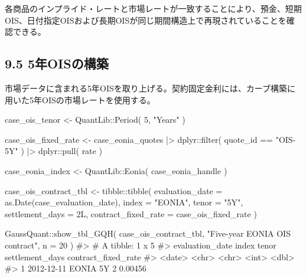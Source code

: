 \documentclass[
  letterpaper,
  DIV=11,
  numbers=noendperiod]{scrreprt}
\newenvironment{Shaded}{\begin{snugshade}}{\end{snugshade}}
\newcommand{\AttributeTok}[1]{\textcolor[rgb]{0.40,0.45,0.13}{#1}}
\newcommand{\CommentTok}[1]{\textcolor[rgb]{0.37,0.37,0.37}{#1}}
\newcommand{\DecValTok}[1]{\textcolor[rgb]{0.68,0.00,0.00}{#1}}
\newcommand{\FunctionTok}[1]{\textcolor[rgb]{0.28,0.35,0.67}{#1}}
\newcommand{\NormalTok}[1]{\textcolor[rgb]{0.00,0.23,0.31}{#1}}
\newcommand{\OtherTok}[1]{\textcolor[rgb]{0.00,0.23,0.31}{#1}}
\newcommand{\SpecialCharTok}[1]{\textcolor[rgb]{0.37,0.37,0.37}{#1}}
\newcommand{\StringTok}[1]{\textcolor[rgb]{0.13,0.47,0.30}{#1}}
\begin{document}
各商品のインプライド・レートと市場レートが一致することにより、預金、短期OIS、日付指定OISおよび長期OISが同じ期間構造上で再現されていることを確認できる。

\subsection{9.5 5年OISの構築}\label{ux5e74oisux306eux69cbux7bc9}

市場データに含まれる5年OISを取り上げる。契約固定金利には、カーブ構築に用いた5年OISの市場レートを使用する。

\begin{Shaded}
\begin{Highlighting}[]
\NormalTok{case\_ois\_tenor }\OtherTok{\textless{}{-}}\NormalTok{ QuantLib}\SpecialCharTok{::}\FunctionTok{Period}\NormalTok{(}
  \DecValTok{5}\NormalTok{,}
  \StringTok{"Years"}
\NormalTok{)}

\NormalTok{case\_ois\_fixed\_rate }\OtherTok{\textless{}{-}}\NormalTok{ case\_eonia\_quotes }\SpecialCharTok{|\textgreater{}}
\NormalTok{  dplyr}\SpecialCharTok{::}\FunctionTok{filter}\NormalTok{(}
\NormalTok{    quote\_id }\SpecialCharTok{==} \StringTok{"OIS{-}5Y"}
\NormalTok{  ) }\SpecialCharTok{|\textgreater{}}
\NormalTok{  dplyr}\SpecialCharTok{::}\FunctionTok{pull}\NormalTok{(}
\NormalTok{    rate}
\NormalTok{  )}

\NormalTok{case\_eonia\_index }\OtherTok{\textless{}{-}}\NormalTok{ QuantLib}\SpecialCharTok{::}\FunctionTok{Eonia}\NormalTok{(}
\NormalTok{  case\_eonia\_handle}
\NormalTok{)}

\NormalTok{case\_ois\_contract\_tbl }\OtherTok{\textless{}{-}}\NormalTok{ tibble}\SpecialCharTok{::}\FunctionTok{tibble}\NormalTok{(}
  \AttributeTok{evaluation\_date =} \FunctionTok{as.Date}\NormalTok{(case\_evaluation\_date),}
  \AttributeTok{index =} \StringTok{"EONIA"}\NormalTok{,}
  \AttributeTok{tenor =} \StringTok{"5Y"}\NormalTok{,}
  \AttributeTok{settlement\_days =} \DecValTok{2}\NormalTok{L,}
  \AttributeTok{contract\_fixed\_rate =}\NormalTok{ case\_ois\_fixed\_rate}
\NormalTok{)}

\NormalTok{GaussQuant}\SpecialCharTok{::}\FunctionTok{show\_tbl\_GQH}\NormalTok{(}
\NormalTok{  case\_ois\_contract\_tbl,}
  \StringTok{"Five{-}year EONIA OIS contract"}\NormalTok{,}
  \AttributeTok{n =} \DecValTok{20}
\NormalTok{)}
\CommentTok{\#\textgreater{} \# A tibble: 1 x 5}
\CommentTok{\#\textgreater{}   evaluation\_date index tenor settlement\_days contract\_fixed\_rate}
\CommentTok{\#\textgreater{}   \textless{}date\textgreater{}          \textless{}chr\textgreater{} \textless{}chr\textgreater{}           \textless{}int\textgreater{}               \textless{}dbl\textgreater{}}
\CommentTok{\#\textgreater{} 1 2012{-}12{-}11      EONIA 5Y                  2             0.00456}
\end{Highlighting}
\end{Shaded}
\end{document}
